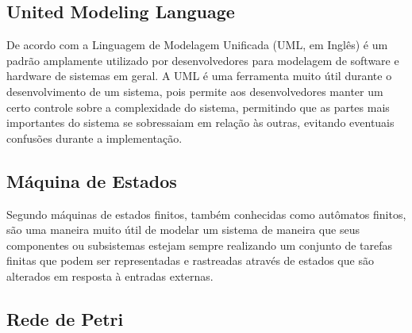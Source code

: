 \subsection{United Modeling Language}

De acordo com  a Linguagem de Modelagem Unificada (UML, em Inglês) é um padrão amplamente utilizado por desenvolvedores para modelagem de software e hardware de sistemas em geral. A UML é uma ferramenta muito útil durante o desenvolvimento de um sistema, pois permite aos desenvolvedores manter um certo controle sobre a complexidade do sistema, permitindo que as partes mais importantes do sistema se sobressaiam em relação às outras, evitando eventuais confusões durante a implementação.




\subsection{Máquina de Estados}

Segundo  máquinas de estados finitos, também conhecidas como autômatos finitos, são uma maneira muito útil de modelar um sistema de maneira que seus componentes ou subsistemas estejam sempre realizando um conjunto de tarefas finitas que podem ser representadas e rastreadas através de estados que são alterados em resposta à entradas externas. 






\subsection{Rede de Petri}
~

